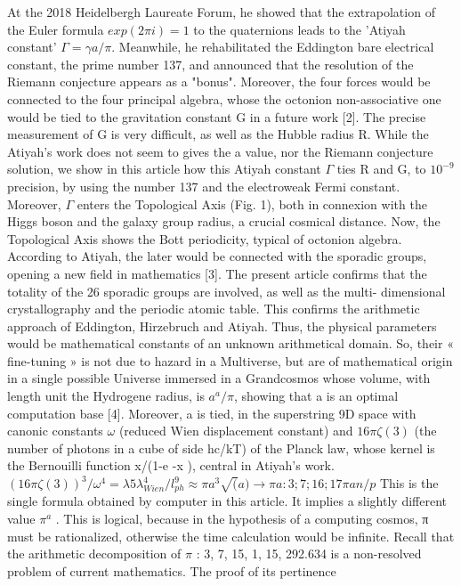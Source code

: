\documentclass[a4paper,9pt]{article}
\begin{document}
At the 2018 Heidelbergh Laureate Forum,
he showed that the extrapolation of the Euler formula $exp(2\pi i) = 1$ to the quaternions leads to the
'Atiyah constant' $\Gamma = \gamma a/\pi$. Meanwhile, he rehabilitated the Eddington bare electrical constant, the
prime number 137, and announced that the resolution of the Riemann conjecture appears as a
"bonus". Moreover, the four forces would be connected to the four principal algebra, whose the
octonion non-associative one would be tied to the gravitation constant G in a future work [2].
The precise measurement of G is very difficult, as well as the Hubble radius R. While the Atiyah's
work does not seem to gives the a value, nor the Riemann conjecture solution, we show in this
article how this Atiyah constant $\Gamma$ ties R and G, to $10^{-9}$ precision, by using the number 137 and the
electroweak Fermi constant. Moreover, $\Gamma$ enters the Topological Axis (Fig. 1), both in connexion
with the Higgs boson and the galaxy group radius, a crucial cosmical distance. Now, the
Topological Axis shows the Bott periodicity, typical of octonion algebra. According to Atiyah, the
later would be connected with the sporadic groups, opening a new field in mathematics [3]. The
present article confirms that the totality of the 26 sporadic groups are involved, as well as the multi-
dimensional crystallography and the periodic atomic table. This confirms the arithmetic approach of
Eddington, Hirzebruch and Atiyah.
Thus, the physical parameters would be mathematical constants of an unknown arithmetical
domain. So, their « fine-tuning » is not due to hazard in a Multiverse, but are of mathematical origin
in a single possible Universe immersed in a Grandcosmos whose volume, with length unit the
Hydrogene radius, is $a^a /\pi$, showing that a is an optimal computation base [4]. Moreover, a is tied, in
the superstring 9D space with canonic constants $\omega$ (reduced Wien displacement constant) and
$16\pi \zeta(3)$ (the number of photons in a cube of side hc/kT) of the Planck law, whose kernel is the
Bernouilli function x/(1-e -x ), central in Atiyah's work.
$(16\pi \zeta(3))^3 /\omega^4 = \lambda 5 \lambda_{Wien}^4 /l_{ph}^9 \approx \pi a^3 \sqrt(a) \rightarrow \pi a : 3;7;16;17\pi a n/p$
This is the single formula obtained by computer in this article. It implies a slightly different value
$\pi^a$ . This is logical, because in the hypothesis of a computing cosmos, π must be rationalized,
otherwise the time calculation would be infinite. Recall that the arithmetic decomposition of $\pi$ : 3,
7, 15, 1, 15, 292.634 is a non-resolved problem of current mathematics. The proof of its pertinence
\end{document}
